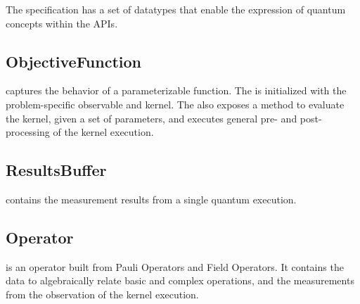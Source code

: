 The \qcor specification has a set of datatypes that enable the expression of quantum concepts within the \qcor \ac{API}s.\\

\subsection{\textbf{ObjectiveFunction}}\label{subsec:ObjectiveFunction}
 captures the behavior of a parameterizable function. The  is initialized with the problem-specific observable and kernel. The  also exposes a method to evaluate the kernel, given a set of parameters, and executes general pre- and post-processing of the kernel execution.\\

\subsection{\textbf{ResultsBuffer}}\label{subsec:ResultsBuffer}
 contains the measurement results from a single quantum execution.\\

\subsection{\textbf{Operator}}\label{subsec:Operator}
 is an operator built from Pauli Operators and Field Operators.
It contains the data to algebraically relate basic and complex operations, 
and the measurements from the observation of the kernel execution.\\

